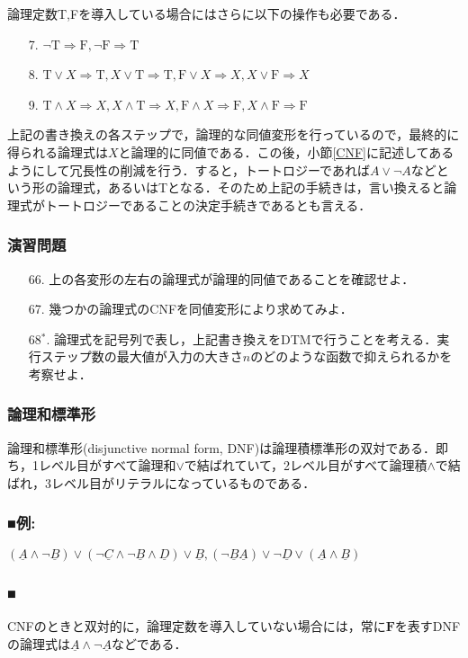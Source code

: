 \documentclass{ltjsarticle}
\theoremstyle{mystyle1}
\theoremstyle{mystyle2}
\newcommand{\uA}{\underline{A}}
\newcommand{\uB}{\underline{B}}
\newcommand{\uC}{\underline{C}}
\newcommand{\uD}{\underline{D}}
\newcommand{\bF}{\ensuremath{\mathbf{F}}}
\newcommand{\rT}{\ensuremath{\mathrm{T}}}
\newcommand{\rF}{\ensuremath{\mathrm{F}}}
\newcommand{\red}[1]{{\color{red} #1}}
\begin{document}
論理定数T,Fを導入している場合にはさらに以下の操作も必要である．
\begin{enumerate}
  \item[7.] $\neg \rT \Rightarrow \rF, \neg\rF\Rightarrow\rT$
  \item[8.] $\rT\vee X\Rightarrow\rT, X\vee\rT\Rightarrow\rT, \rF\vee X\Rightarrow X,X\vee\rF\Rightarrow X$
  \item[9.] $\rT\wedge X\Rightarrow X,X\wedge\rT\Rightarrow X, \rF\wedge X\Rightarrow\rF,X\wedge\rF\Rightarrow\rF$
\end{enumerate}
上記の書き換えの各ステップで，論理的な同値変形を行っているので，最終的に得られる論理式は$X$と論理的に同値である．この後，小節\ref{CNF}に記述してあるようにして冗長性の削減を行う．すると，トートロジーであれば$A\vee\neg A$などという形の論理式，あるいはTとなる．そのため上記の手続きは，言い換えると論理式がトートロジーであることの決定手続きであるとも言える．
\subsubsection*{演習問題}
\begin{enumerate}
  \item[66.] 上の各変形の左右の論理式が論理的同値であることを確認せよ．
  \item[67.] 幾つかの論理式のCNFを同値変形により求めてみよ．
  \item[68$^\ast$.] 論理式を記号列で表し，上記書き換えをDTMで行うことを考える．実行ステップ数の最大値が入力の大きさ$n$のどのような函数で抑えられるかを考察せよ．
\end{enumerate}
\subsubsection{論理和標準形}
\red{論理和標準形}(disjunctive normal form, DNF)は論理積標準形の双対である．即ち，1レベル目がすべて論理和$\vee$で結ばれていて，2レベル目がすべて論理積$\wedge$で結ばれ，3レベル目がリテラルになっているものである．
\subsubsection*{■例:}
$(\uA\wedge\neg\uB)\vee(\neg\uC\wedge\neg\uB\wedge\uD)\vee\uB,(\neg\uB\uA)\vee\neg\uD\vee(\uA\wedge\uB)$
\subsubsection*{■}
CNFのときと双対的に，論理定数を導入していない場合には，常に$\bF$を表すDNFの論理式は$\uA\wedge\neg\uA$などである．
\end{document}
